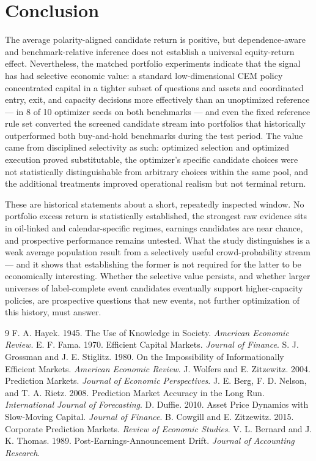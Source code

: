\documentclass[sigconf,anonymous]{acmart}
\begin{document}
\section{Conclusion}

The average polarity-aligned candidate return is positive, but dependence-aware and benchmark-relative inference does not establish a universal equity-return effect. Nevertheless, the matched portfolio experiments indicate that the signal has had selective economic value: a standard low-dimensional CEM policy concentrated capital in a tighter subset of questions and assets and coordinated entry, exit, and capacity decisions more effectively than an unoptimized reference --- in 8 of 10 optimizer seeds on both benchmarks --- and even the fixed reference rule set converted the screened candidate stream into portfolios that historically outperformed both buy-and-hold benchmarks during the test period. The value came from disciplined selectivity as such: optimized selection and optimized execution proved substitutable, the optimizer's specific candidate choices were not statistically distinguishable from arbitrary choices within the same pool, and the additional treatments improved operational realism but not terminal return.

These are historical statements about a short, repeatedly inspected window. No portfolio excess return is statistically established, the strongest raw evidence sits in oil-linked and calendar-specific regimes, earnings candidates are near chance, and prospective performance remains untested. What the study distinguishes is a weak average population result from a selectively useful crowd-probability stream --- and it shows that establishing the former is not required for the latter to be economically interesting. Whether the selective value persists, and whether larger universes of label-complete event candidates eventually support higher-capacity policies, are prospective questions that new events, not further optimization of this history, must answer.

\begin{thebibliography}{9}
 F. A. Hayek. 1945. The Use of Knowledge in Society. \emph{American Economic Review}.
 E. F. Fama. 1970. Efficient Capital Markets. \emph{Journal of Finance}.
 S. J. Grossman and J. E. Stiglitz. 1980. On the Impossibility of Informationally Efficient Markets. \emph{American Economic Review}.
 J. Wolfers and E. Zitzewitz. 2004. Prediction Markets. \emph{Journal of Economic Perspectives}.
 J. E. Berg, F. D. Nelson, and T. A. Rietz. 2008. Prediction Market Accuracy in the Long Run. \emph{International Journal of Forecasting}.
 D. Duffie. 2010. Asset Price Dynamics with Slow-Moving Capital. \emph{Journal of Finance}.
 B. Cowgill and E. Zitzewitz. 2015. Corporate Prediction Markets. \emph{Review of Economic Studies}.
 V. L. Bernard and J. K. Thomas. 1989. Post-Earnings-Announcement Drift. \emph{Journal of Accounting Research}.
\end{thebibliography}
\end{document}
